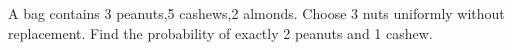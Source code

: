 A bag contains 3 peanuts,5 cashews,2 almonds. Choose 3 nuts uniformly without replacement. Find the probability of exactly 2 peanuts and 1 cashew.
